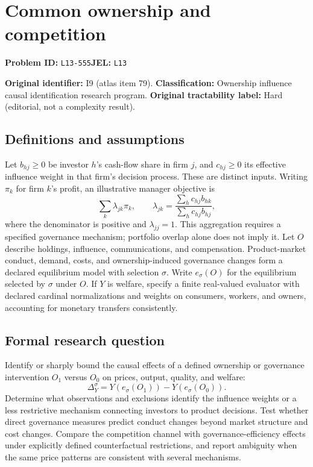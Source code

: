 \documentclass[11pt,a4paper]{article}
\begin{document}
\section*{Common ownership and competition}
\textbf{Problem ID:} \texttt{L13-555}\quad \textbf{JEL:} \texttt{L13}\par
\label{problem:OP-0079}
\label{atlas:prob:I9}

\noindent\textbf{Original identifier:} I9 (atlas item 79). \textbf{Classification:} Ownership influence causal identification research program. \textbf{Original tractability label:} Hard (editorial, not a complexity result).

\subsection*{Definitions and assumptions}

Let $b_{hj}\geq0$ be investor $h$'s cash-flow share in firm $j$, and $c_{hj}\geq0$ its effective influence weight in that firm's decision process. These are distinct inputs. Writing $\pi_k$ for firm $k$'s profit, an illustrative manager objective is
\[
\sum_k\lambda_{jk}\pi_k,\qquad
\lambda_{jk}=\frac{\sum_hc_{hj}b_{hk}}{\sum_hc_{hj}b_{hj}},
\]
where the denominator is positive and $\lambda_{jj}=1$. This aggregation requires a specified governance mechanism; portfolio overlap alone does not imply it. Let $O$ describe holdings, influence, communications, and compensation. Product-market conduct, demand, costs, and ownership-induced governance changes form a declared equilibrium model with selection $\sigma$. Write $e_\sigma(O)$ for the equilibrium selected by $\sigma$ under $O$. If $Y$ is welfare, specify a finite real-valued evaluator with declared cardinal normalizations and weights on consumers, workers, and owners, accounting for monetary transfers consistently.

\subsection*{Formal research question}

Identify or sharply bound the causal effects of a defined ownership or governance intervention $O_1$ versus $O_0$ on prices, output, quality, and welfare:
\[
\Delta_Y^\sigma=Y(e_\sigma(O_1))-Y(e_\sigma(O_0)).
\]
Determine what observations and exclusions identify the influence weights or a less restrictive mechanism connecting investors to product decisions. Test whether direct governance measures predict conduct changes beyond market structure and cost changes. Compare the competition channel with governance-efficiency effects under explicitly defined counterfactual restrictions, and report ambiguity when the same price patterns are consistent with several mechanisms.
\end{document}
